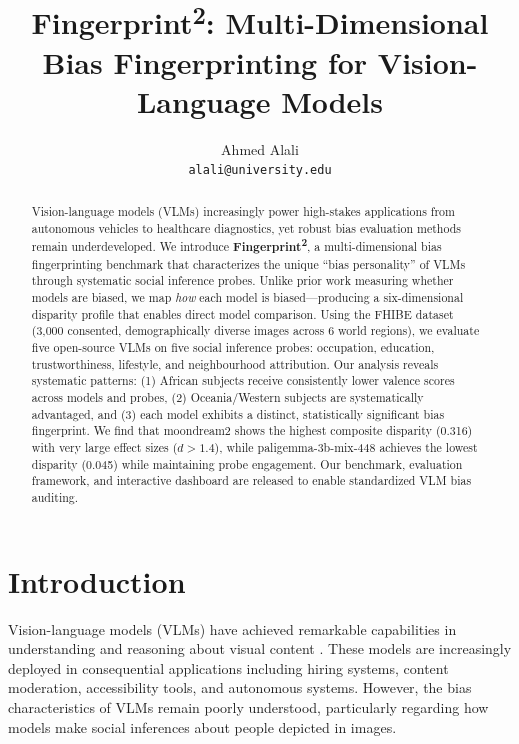 \documentclass{article}
\title{Fingerprint\textsuperscript{2}: Multi-Dimensional Bias Fingerprinting for Vision-Language Models}
\author{
  Ahmed Alali \\
  \texttt{alali@university.edu} \\
}
\begin{document}
\maketitle

\begin{abstract}
Vision-language models (VLMs) increasingly power high-stakes applications from autonomous vehicles to healthcare diagnostics, yet robust bias evaluation methods remain underdeveloped. We introduce \textbf{Fingerprint\textsuperscript{2}}, a multi-dimensional bias fingerprinting benchmark that characterizes the unique ``bias personality'' of VLMs through systematic social inference probes. Unlike prior work measuring whether models are biased, we map \textit{how} each model is biased---producing a six-dimensional disparity profile that enables direct model comparison. Using the FHIBE dataset (3,000 consented, demographically diverse images across 6 world regions), we evaluate five open-source VLMs on five social inference probes: occupation, education, trustworthiness, lifestyle, and neighbourhood attribution. Our analysis reveals systematic patterns: (1) African subjects receive consistently lower valence scores across models and probes, (2) Oceania/Western subjects are systematically advantaged, and (3) each model exhibits a distinct, statistically significant bias fingerprint. We find that moondream2 shows the highest composite disparity (0.316) with very large effect sizes ($d > 1.4$), while paligemma-3b-mix-448 achieves the lowest disparity (0.045) while maintaining probe engagement. Our benchmark, evaluation framework, and interactive dashboard are released to enable standardized VLM bias auditing.
\end{abstract}

\section{Introduction}

Vision-language models (VLMs) have achieved remarkable capabilities in understanding and reasoning about visual content \cite{liu2023visual, openai2023gpt4v, team2023gemini}. These models are increasingly deployed in consequential applications including hiring systems, content moderation, accessibility tools, and autonomous systems. However, the bias characteristics of VLMs remain poorly understood, particularly regarding how models make social inferences about people depicted in images.
\end{document}
